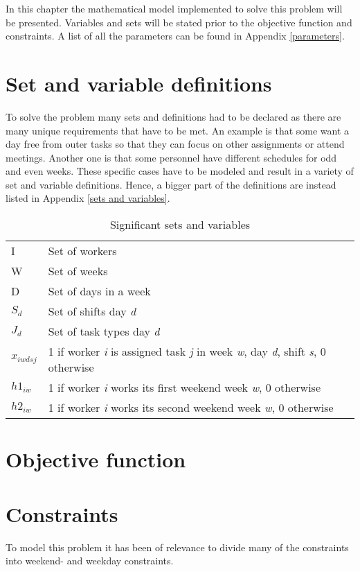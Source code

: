 In this chapter the mathematical model implemented to solve this problem will be presented. Variables and sets will be stated prior to the objective function and constraints. A list of all the parameters can be found in Appendix \ref{parameters}. 
\section{Set and variable definitions} \label{variables}
To solve the problem many sets and definitions had to be declared as there are many unique requirements that have to be met. An example is that some want a day free from outer tasks so that they can focus on other assignments or attend meetings. Another one is that some personnel have different schedules for odd and even weeks. These specific cases have to be modeled and result in a variety of set and variable definitions. Hence, a bigger part of the definitions are instead listed in Appendix \ref{sets and variables}.
\begin{table}[H]
\centering
\caption{Significant sets and variables}
\label{tab:sets and variables}
\begin{tabular}{ll}
I                & Set of workers                                             \\
W                & Set of weeks                                               \\
D                & Set of days in a week                                      \\
$S_d$           & Set of shifts day \textit{d}                                        \\
$J_d$           & Set of task types day \textit{d}                                    \\
$x_{iwdsj}$ & 1 if worker \textit{i} is assigned task \textit{j} in week \textit{w}, day \textit{d}, shift \textit{s}, 0 otherwise \\
$h1_{iw}$      & 1 if worker \textit{i} works its first weekend week \textit{w}, 0 otherwise               \\
$h2_{iw}$      & 1 if worker \textit{i} works its second weekend week \textit{w}, 0 otherwise             
\end{tabular}
\end{table}


\section{Objective function}

\section{Constraints}
To model this problem it has been of relevance to divide many of the constraints into weekend- and weekday constraints. 